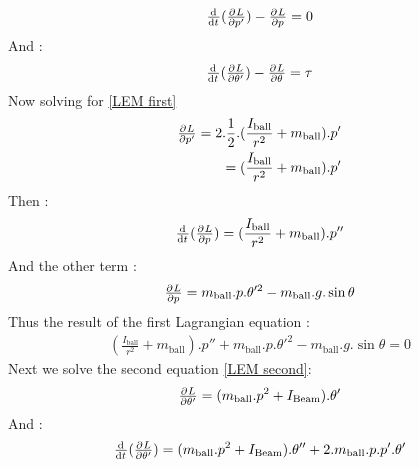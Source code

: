 \documentclass{article}
\begin{document}
\begin{equation}\label{LEM first}
	\begin{split}
		\od{}{t}(\pd{L}{p'}) - \pd{L}{p} = 0
	\end{split}
\end{equation}
And :
\begin{equation}\label{LEM second}
	\begin{split}
		\od{}{t}(\pd{L}{\theta'}) - \pd{L}{\theta} = \tau
	\end{split}	
\end{equation}
Now solving for \ref{LEM first}
\begin{equation}
	\begin{split}
		\pd{L}{p'} = 2.\frac{1}{2}.(\frac{I_{\text{ball}}}{r^2}+m_{\text{ball}}).p'\\
			= (\frac{I_{\text{ball}}}{r^2}+m_{\text{ball}}).p'
	\end{split}	
\end{equation}
Then :
\begin{equation}
	\begin{split}
		\od{}{t}(\pd{L}{p}) = (\frac{I_{\text{ball}}}{r^2}+m_{\text{ball}}).p''
	\end{split}
\end{equation}
And the other term :
\begin{equation}
	\begin{split}
	\pd{L}{p} = m_{\text{ball}}.p.\theta'^2 - m_{\text{ball}}.g.\sin{\theta}
	\end{split}
\end{equation}
Thus the result of the first Lagrangian equation :
\begin{equation}
	\begin{split}
		(\frac{I_{\text{ball}}}{r^2}+m_{\text{ball}}).p'' +  m_{\text{ball}}.p.\theta'^2 - m_{\text{ball}}.g.\sin{\theta} = 0
	\end{split}
\end{equation}
Next we solve the second equation \ref{LEM second}:
\begin{equation}
	\begin{split}
		\pd{L}{\theta'} = (m_{\text{ball}}.p^2 + I_{\text{Beam}}).\theta'
	\end{split}
\end{equation}
And : 
\begin{equation}
	\begin{split}
		\od{}{t}(\pd{L}{\theta'}) = (m_{\text{ball}}.p^2 + I_{\text{Beam}}).\theta'' + 2.m_{\text{ball}}.p.p'.\theta'
	\end{split}
\end{equation}
\end{document}
